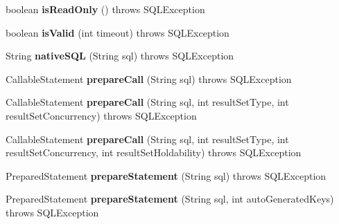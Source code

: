 \begin{DoxyCompactItemize}
boolean {\bfseries is\+Read\+Only} ()  throws S\+Q\+L\+Exception 
\item 
\mbox{\label{classsimpledb_1_1jdbc_1_1ConnectionAdapter_ac96d6ea164d3f2dcefff5900856f12ae}} 
boolean {\bfseries is\+Valid} (int timeout)  throws S\+Q\+L\+Exception 
\item 
\mbox{\label{classsimpledb_1_1jdbc_1_1ConnectionAdapter_a42dc0b785d21340a5f34ea4254d3fc67}} 
String {\bfseries native\+S\+QL} (String sql)  throws S\+Q\+L\+Exception 
\item 
\mbox{\label{classsimpledb_1_1jdbc_1_1ConnectionAdapter_a0328a25ec4c15d8d296e6e620d4272f5}} 
Callable\+Statement {\bfseries prepare\+Call} (String sql)  throws S\+Q\+L\+Exception 
\item 
\mbox{\label{classsimpledb_1_1jdbc_1_1ConnectionAdapter_aee317ad2fde6f0060e3a40ceb6dc803a}} 
Callable\+Statement {\bfseries prepare\+Call} (String sql, int result\+Set\+Type, int result\+Set\+Concurrency)  throws S\+Q\+L\+Exception 
\item 
\mbox{\label{classsimpledb_1_1jdbc_1_1ConnectionAdapter_a3256ce7770ec002c91e9ccb5b2a7b582}} 
Callable\+Statement {\bfseries prepare\+Call} (String sql, int result\+Set\+Type, int result\+Set\+Concurrency, int result\+Set\+Holdability)  throws S\+Q\+L\+Exception 
\item 
\mbox{\label{classsimpledb_1_1jdbc_1_1ConnectionAdapter_aba1b11c20ccdab6be59cf18e57ed2af8}} 
Prepared\+Statement {\bfseries prepare\+Statement} (String sql)  throws S\+Q\+L\+Exception 
\item 
\mbox{\label{classsimpledb_1_1jdbc_1_1ConnectionAdapter_a4270806befae4a80d6a876cc7e6bb26a}} 
Prepared\+Statement {\bfseries prepare\+Statement} (String sql, int auto\+Generated\+Keys)  throws S\+Q\+L\+Exception 
\item 
\mbox{\label{classsimpledb_1_1jdbc_1_1ConnectionAdapter_af460f95a35c6fc59321fd8e6f681a31d}} 

\end{DoxyCompactItemize}

